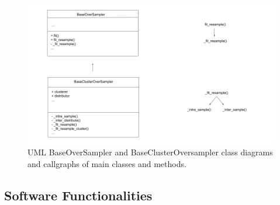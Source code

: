 \documentclass[preprint,12pt, a4paper]{elsarticle}
\begin{document}
\begin{figure}[H]
	\centering
	\includegraphics[width=1\linewidth]{artifacts/oversampler_class_diagram}
	\caption{UML BaseOverSampler and BaseClusterOversampler class diagrams and callgraphs of main classes and methods.}
	\label{fig:oversampler_class_diagram}
\end{figure}

\subsection{Software Functionalities}
\label{functionality}
\end{document}
